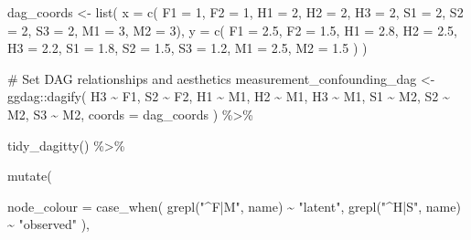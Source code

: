 \documentclass[
  letterpaper,
  DIV=11,
  numbers=noendperiod]{scrreprt}
\newenvironment{Shaded}{\begin{snugshade}}{\end{snugshade}}
\newcommand{\AttributeTok}[1]{\textcolor[rgb]{0.40,0.45,0.13}{#1}}
\newcommand{\CommentTok}[1]{\textcolor[rgb]{0.37,0.37,0.37}{#1}}
\newcommand{\DecValTok}[1]{\textcolor[rgb]{0.68,0.00,0.00}{#1}}
\newcommand{\FloatTok}[1]{\textcolor[rgb]{0.68,0.00,0.00}{#1}}
\newcommand{\FunctionTok}[1]{\textcolor[rgb]{0.28,0.35,0.67}{#1}}
\newcommand{\NormalTok}[1]{\textcolor[rgb]{0.00,0.23,0.31}{#1}}
\newcommand{\OtherTok}[1]{\textcolor[rgb]{0.00,0.23,0.31}{#1}}
\newcommand{\SpecialCharTok}[1]{\textcolor[rgb]{0.37,0.37,0.37}{#1}}
\newcommand{\StringTok}[1]{\textcolor[rgb]{0.13,0.47,0.30}{#1}}
\begin{document}
\begin{Shaded}
\begin{Highlighting}[]
\NormalTok{dag\_coords }\OtherTok{\textless{}{-}} \FunctionTok{list}\NormalTok{(}
  \AttributeTok{x =} \FunctionTok{c}\NormalTok{(}
    \AttributeTok{F1 =} \DecValTok{1}\NormalTok{, }
    \AttributeTok{F2 =} \DecValTok{1}\NormalTok{,}
    \AttributeTok{H1 =} \DecValTok{2}\NormalTok{,}
    \AttributeTok{H2 =} \DecValTok{2}\NormalTok{,}
    \AttributeTok{H3 =} \DecValTok{2}\NormalTok{,}
    \AttributeTok{S1 =} \DecValTok{2}\NormalTok{,}
    \AttributeTok{S2 =} \DecValTok{2}\NormalTok{,}
    \AttributeTok{S3 =} \DecValTok{2}\NormalTok{,}
    \AttributeTok{M1 =} \DecValTok{3}\NormalTok{,}
    \AttributeTok{M2 =} \DecValTok{3}\NormalTok{),}
  \AttributeTok{y =} \FunctionTok{c}\NormalTok{(}
    \AttributeTok{F1 =} \FloatTok{2.5}\NormalTok{,}
    \AttributeTok{F2 =} \FloatTok{1.5}\NormalTok{,}
    \AttributeTok{H1 =} \FloatTok{2.8}\NormalTok{,}
    \AttributeTok{H2 =} \FloatTok{2.5}\NormalTok{,}
    \AttributeTok{H3 =} \FloatTok{2.2}\NormalTok{,}
    \AttributeTok{S1 =} \FloatTok{1.8}\NormalTok{,}
    \AttributeTok{S2 =} \FloatTok{1.5}\NormalTok{,}
    \AttributeTok{S3 =} \FloatTok{1.2}\NormalTok{,}
    \AttributeTok{M1 =} \FloatTok{2.5}\NormalTok{,}
    \AttributeTok{M2 =} \FloatTok{1.5}
\NormalTok{  )}
\NormalTok{)}

\CommentTok{\# Set DAG relationships and aesthetics}
\NormalTok{measurement\_confounding\_dag }\OtherTok{\textless{}{-}}\NormalTok{ ggdag}\SpecialCharTok{::}\FunctionTok{dagify}\NormalTok{(}
\NormalTok{  H3 }\SpecialCharTok{\textasciitilde{}}\NormalTok{ F1,}
\NormalTok{  S2 }\SpecialCharTok{\textasciitilde{}}\NormalTok{ F2,}
\NormalTok{  H1 }\SpecialCharTok{\textasciitilde{}}\NormalTok{ M1,}
\NormalTok{  H2 }\SpecialCharTok{\textasciitilde{}}\NormalTok{ M1,}
\NormalTok{  H3 }\SpecialCharTok{\textasciitilde{}}\NormalTok{ M1,}
\NormalTok{  S1 }\SpecialCharTok{\textasciitilde{}}\NormalTok{ M2,}
\NormalTok{  S2 }\SpecialCharTok{\textasciitilde{}}\NormalTok{ M2,}
\NormalTok{  S3 }\SpecialCharTok{\textasciitilde{}}\NormalTok{ M2,}
  \AttributeTok{coords =}\NormalTok{ dag\_coords}
\NormalTok{) }\SpecialCharTok{\%\textgreater{}\%} 
  
  \FunctionTok{tidy\_dagitty}\NormalTok{() }\SpecialCharTok{\%\textgreater{}\%} 
  
  \FunctionTok{mutate}\NormalTok{(}
    
    \AttributeTok{node\_colour =} \FunctionTok{case\_when}\NormalTok{(}
      \FunctionTok{grepl}\NormalTok{(}\StringTok{"\^{}F|M"}\NormalTok{, name) }\SpecialCharTok{\textasciitilde{}} \StringTok{"latent"}\NormalTok{,}
      \FunctionTok{grepl}\NormalTok{(}\StringTok{"\^{}H|S"}\NormalTok{, name) }\SpecialCharTok{\textasciitilde{}} \StringTok{"observed"}
\NormalTok{    ),}
    

\end{Highlighting}
\end{Shaded}
\end{document}
